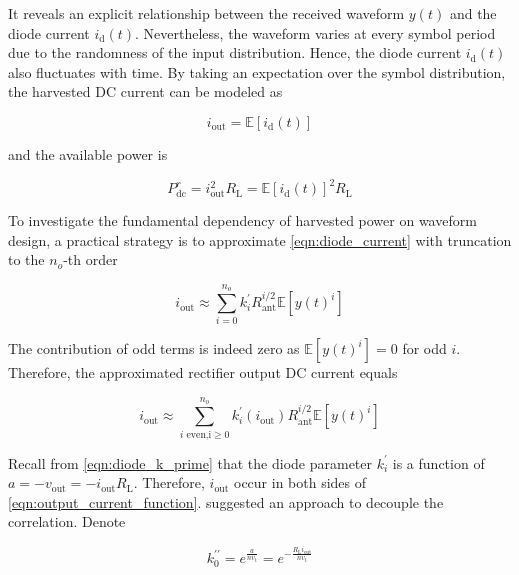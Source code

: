 It reveals an explicit relationship between the received waveform $y(t)$ and the diode current ${i_{\text{d}}}(t)$. Nevertheless, the waveform varies at every symbol period due to the randomness of the input distribution. Hence, the diode current ${i_{\text{d}}}(t)$ also fluctuates with time. By taking an expectation over the symbol distribution, the harvested DC current can be modeled as

\begin{equation}\label{eqn:diode_current_expectation}
  {i_{{\text{out}}}} = \mathbb{E}\left[ {{i_{\text{d}}}(t)} \right]
\end{equation}

and the available power is

\begin{equation}\label{eqn:harvested_power}
  P_{{\text{dc}}}^r = i_{{\text{out}}}^2{R_{\text{L}}} = \mathbb{E}{\left[ {{i_{\text{d}}}(t)} \right]^2}{R_{\text{L}}}
\end{equation}

To investigate the fundamental dependency of harvested power on waveform design, a practical strategy is to approximate \eqref{eqn:diode_current} with truncation to the ${n_o}$-th order

\begin{equation}\label{eqn:output_current_truncation}
  {i_{{\text{out}}}} \approx \sum\limits_{i = 0}^{{n_o}} {k_i^\prime } R_{{\text{ant}}}^{i/2}\mathbb{E}\left[ {y{{(t)}^i}} \right]
\end{equation}

The contribution of odd terms is indeed zero as $\mathbb{E}\left[ {y{{(t)}^i}} \right] = 0$ for odd $i$. Therefore, the approximated rectifier output DC current equals

\begin{equation}\label{eqn:output_current_function}
  {i_{{\text{out}}}} \approx \sum\limits_{i{\text{ even,i}} \geqslant 0}^{{n_o}} {k_i^\prime \left( {{i_{{\text{out}}}}} \right)} R_{{\text{ant}}}^{i/2}\mathbb{E}\left[ {y{{(t)}^i}} \right]
\end{equation}

Recall from \eqref{eqn:diode_k_prime} that the diode parameter $k_i^\prime $ is a function of $a =  - {v_{{\text{out}}}} =  - {i_{{\text{out}}}}{R_{\text{L}}}$. Therefore, ${i_{{\text{out}}}}$ occur in both sides of \eqref{eqn:output_current_function}. \cite{Clerckx2016} suggested an approach to decouple the correlation. Denote

\begin{equation}\label{eqn:diode_k_prime_prime}
  k_0^{\prime \prime } = {e^{\frac{a}{{n{v_{\text{t}}}}}}} = {e^{ - \frac{{{R_{\text{L}}}{i_{{\text{out}}}}}}{{n{v_{\text{t}}}}}}}
\end{equation}

